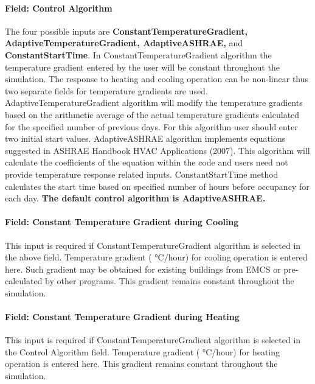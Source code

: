 \paragraph{Field: Control Algorithm}\label{field-control-algorithm}

The four possible inputs are \textbf{ConstantTemperatureGradient, AdaptiveTemperatureGradient, AdaptiveASHRAE,} and \textbf{ConstantStartTime}. In ConstantTemperatureGradient algorithm the temperature gradient entered by the user will be constant throughout the simulation. The response to heating and cooling operation can be non-linear thus two separate fields for temperature gradients are used. AdaptiveTemperatureGradient algorithm will modify the temperature gradients based on the arithmetic average of the actual temperature gradients calculated for the specified number of previous days. For this algorithm user should enter two initial start values. AdaptiveASHRAE algorithm implements equations suggested in ASHRAE Handbook HVAC Applications (2007). This algorithm will calculate the coefficients of the equation within the code and users need not provide temperature response related inputs. ConstantStartTime method calculates the start time based on specified number of hours before occupancy for each day. \textbf{The default control algorithm is AdaptiveASHRAE.}

\paragraph{Field: Constant Temperature Gradient during Cooling}\label{field-constant-temperature-gradient-during-cooling}

This input is required if ConstantTemperatureGradient algorithm is selected in the above field. Temperature gradient ( °C/hour) for cooling operation is entered here. Such gradient may be obtained for existing buildings from EMCS or pre-calculated by other programs. This gradient remains constant throughout the simulation.

\paragraph{Field: Constant Temperature Gradient during Heating}\label{field-constant-temperature-gradient-during-heating}

This input is required if ConstantTemperatureGradient algorithm is selected in the Control Algorithm field. Temperature gradient ( °C/hour) for heating operation is entered here. This gradient remains constant throughout the simulation.

